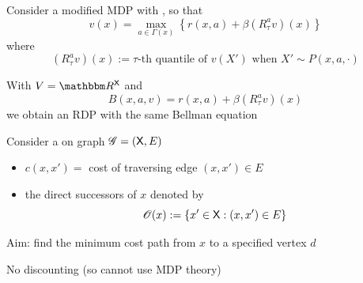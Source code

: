 \documentclass[dvipsnames]{beamer}
\begin{document}
\begin{frame}
    
    \Eg Consider a modified MDP with , so that
    \begin{equation*}
        v(x) = \max_{a \in \Gamma(x)}
            \left\{
                r(x, a) + \beta (R^a_\tau v)(x)
            \right\}
    \end{equation*}
     where
    \begin{equation*}
        (R^a_\tau v)(x)
        := \text{$\tau$-th quantile of } 
        v(X') \text{ when } 
        X' \sim P(x, a, \cdot)
    \end{equation*}

    \vspace{0.5em}
    \vspace{0.5em}
    With $V = \RR^\Xsf$ and 
    \begin{equation*}
        B(x, a, v) =    
                r(x, a) + \beta (R^a_\tau v)(x)
    \end{equation*}
    we obtain an RDP with the same Bellman equation

\end{frame}




\begin{frame}
    
    \Eg Consider a  on graph $\mathscr G = (\mathsf X, E)$

    \vspace{0.5em}

    \begin{itemize}
        \item $c(x,x') =$ cost of traversing edge $(x,x') \in E$
        \vspace{0.5em}
        \item the direct successors of $x$ denoted by
            \begin{equation*}
                \mathscr O(x) := \{ x' \in \mathsf X : (x, x') \in E \}   
            \end{equation*}
    \end{itemize}
    

    \vspace{0.5em}
    \vspace{0.5em}
    \vspace{0.5em}
    Aim: find the minimum cost path from $x$ to a specified vertex $d$ 

    \vspace{0.5em}

    No discounting (so cannot use MDP theory)

\end{frame}
\end{document}
